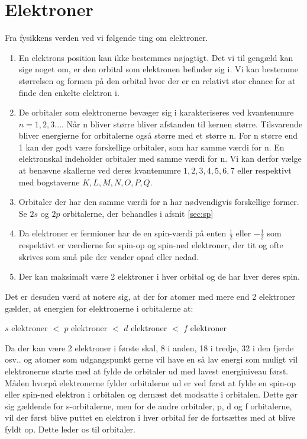 

\section{Elektroner}\label{elektroner}
Fra fysikkens verden ved vi følgende ting om elektroner. 

\begin{enumerate}
\item En elektrons position kan ikke bestemmes nøjagtigt. Det vi til gengæld kan sige noget om, er den orbital som elektronen befinder sig i. Vi kan bestemme størrelsen og formen på den orbital hvor der er en relativt stor chance for at finde den enkelte elektron i.

\item De orbitaler som elektronerne bevæger sig i karakteriseres ved kvantenumre $n = 1,2,3 ...$. Når n bliver større bliver afstanden til kernen større. Tilsvarende bliver energierne for orbitalerne også større med et større n. For n større end 1 kan der godt være forskellige orbitaler, som har samme værdi for n. En elektronskal indeholder orbitaler med samme værdi for n. Vi kan derfor vælge at benævne skallerne ved deres kvantenumre $1,2,3,4,5,6,7$ eller respektivt med bogstaverne $K,L,M,N,O,P,Q$. 

\item Orbitaler der har den samme værdi for n har nødvendigvis forskellige former. Se $2s$ og $2p$ orbitalerne, der behandles i afsnit \ref{sec:sp}

\item Da elektroner er fermioner har de en spin-værdi på enten $\frac{1}{2}$ eller $-\frac{1}{2}$ som respektivt er værdierne for spin-op og spin-ned elektroner, der tit og ofte skrives som små pile der vender opad eller nedad.
\\

\item Der kan maksimalt være 2 elektroner i hver orbital og de har hver deres spin.
\end{enumerate}

Det er desuden værd at notere sig, at der for atomer med mere end 2 elektroner gælder, at energien for elektronerne i orbitalerne at:

\bigskip
\begin{center}
$s$ elektroner $<$ $p$ elektroner $<$ $d$ elektroner $<$ $f$ elektroner
\end{center}
\bigskip

Da der kan være 2 elektroner i første skal, 8 i anden, 18 i tredje, 32 i den fjerde osv.. og atomer som udgangspunkt gerne vil have en så lav energi som muligt vil elektronerne starte med at fylde de orbitaler ud med lavest energiniveau først. Måden hvorpå elektronerne fylder orbitalerne ud er ved først at fylde en spin-op eller spin-ned elektron i orbitalen og dernæst det modsatte i orbitalen. Dette gør sig gældende for s-orbitalerne, men for de andre orbitaler, p, d og f orbitalerne, vil der først blive puttet en elektron i hver orbital før de fortsættes med at blive fyldt op. Dette leder os til orbitaler.